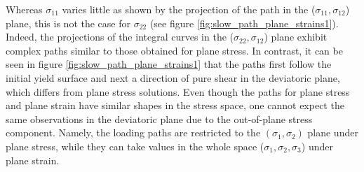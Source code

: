 Whereas $\sigma_{11}$ varies little as shown by the projection of the path in the ($\sigma_{11},\sigma_{12}$) plane, this is not the case for $\sigma_{22}$ (see figure \ref{fig:slow_path_plane_strains1}).
Indeed, the projections of the integral curves in the ($\sigma_{22},\sigma_{12}$) plane exhibit complex paths similar to those obtained for plane stress.
In contrast, it can be seen in figure \ref{fig:slow_path_plane_strains1} that the paths first follow the initial yield surface and next a direction of pure shear in the deviatoric plane, which differs from plane stress solutions.
Even though the paths for plane stress and plane strain have similar shapes in the stress space, one cannot expect the same observations in the deviatoric plane due to the out-of-plane stress component.
Namely, the loading paths are restricted to the $(\sigma_1,\sigma_2)$ plane under plane stress, while they can take values in the whole space ($\sigma_1,\sigma_2,\sigma_3$) under plane strain.

